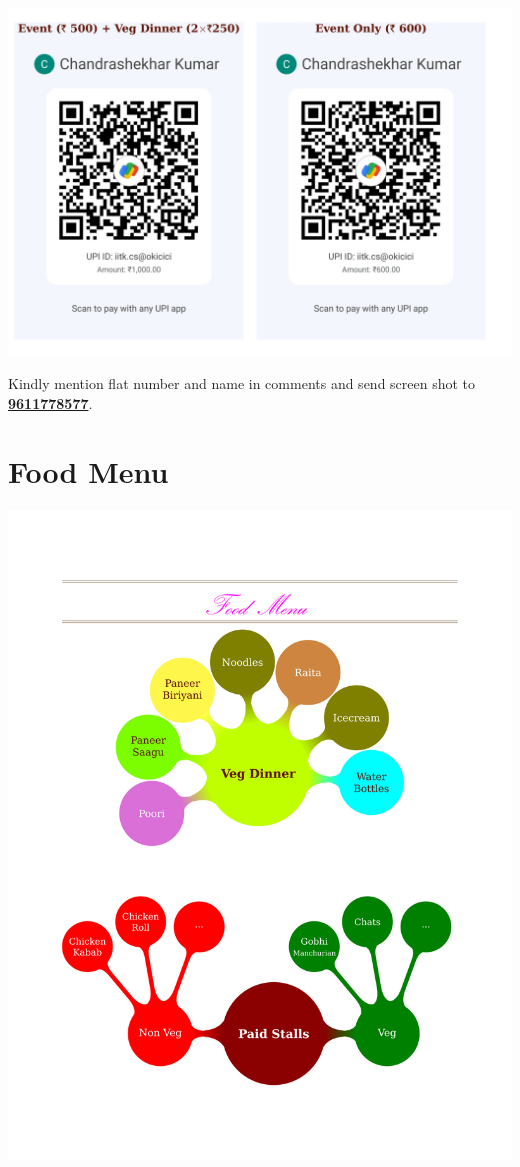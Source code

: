 \documentclass[makeidx, 11pt, oneside, onecolumn, openright, final, svgnames, dvipsnames, extrafontsizes]{memoir}
\begin{document}
\begin{center}
\includegraphics[scale=1]{qrcode.jpeg}
\end{center}

 Kindly mention flat number and name in comments and send screen shot to \textbf{\color{Fuchsia}\href{https://wa.me/919611778577}{9611778577}}.
 
 
 
 \chapter*{Food Menu}
 
 \begin{center}
 \includegraphics[scale=1]{menu.jpeg}
\end{center}
 
\end{document}
